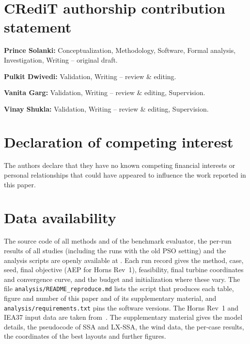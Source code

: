 
\section*{CRediT authorship contribution statement}

\noindent\textbf{Prince Solanki:} Conceptualization, Methodology, Software, Formal analysis, Investigation, Writing -- original draft. 

\noindent\textbf{Pulkit Dwivedi:} Validation, Writing -- review \& editing. 

\noindent\textbf{Vanita Garg:} Validation, Writing -- review \& editing, Supervision. 

\noindent\textbf{Vinay Shukla:} Validation, Writing -- review \& editing, Supervision. 

\section*{Declaration of competing interest}
The authors declare that they have no known competing financial interests or personal relationships that could have appeared to influence the work reported in this paper. 

\section*{Data availability}
The source code of all methods and of the benchmark evaluator, the per-run results of all studies (including the runs with the old PSO setting) and the analysis scripts are openly available at . Each run record gives the method, case, seed, final objective (AEP for Horns Rev~1), feasibility, final turbine coordinates and convergence curve, and the budget and initialization where these vary. The file \texttt{analysis/README\_reproduce.md} lists the script that produces each table, figure and number of this paper and of its supplementary material, and \texttt{analysis/requirements.txt} pins the software versions. The Horns Rev~1 and IEA37 input data are taken from~\cite{PyWake,IEA37repo}. The supplementary material gives the model details, the pseudocode of SSA and LX-SSA, the wind data, the per-case results, the coordinates of the best layouts and further figures.

